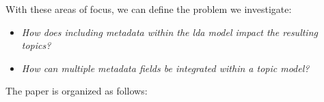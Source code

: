 With these areas of focus, we can define the problem we investigate:

\begin{itemize}
	\item \textit{How does including metadata within the \gls{lda} model impact the resulting topics?}
	\item \textit{How can multiple metadata fields be integrated within a topic model?}
\end{itemize}

The paper is organized as follows: 
